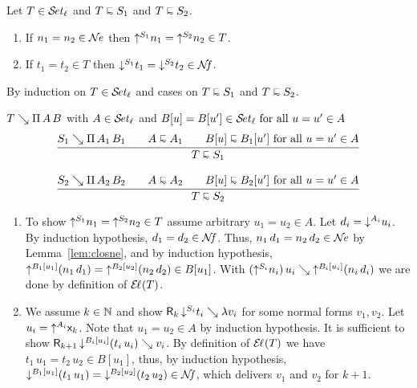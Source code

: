 \documentclass[acmlarge,review,anonymous]{acmart}\settopmatter{printfolios=true}
\makeatletter
\newenvironment{proof*}[1][\proofname]{\par
  \normalfont \topsep6\p@\@plus6\p@\relax
  \trivlist
  \item[\@proofindent\hskip\labelsep
        {\@proofnamefont #1\@addpunct{.}}]\ignorespaces
}{%
  \endtrivlist\@endpefalse
}
\makeatother
\begin{document}
\begin{theorem}
\label{thm:rere}
Let $T \in \SET[\ell]$ and $T \shape S_1$ and $T \shape S_2$.
\begin{enumerate}
\item If\/ $n_1 = n_2 \in \NE$ then $\up{S_1}{n_1} = \up{S_2}{n_2} \in T$.
\item If\/ $t_1 = t_2 \in T$ then $\down{S_1}{t_1} = \down{S_2}{t_2} \in \NF$.
\end{enumerate}
\end{theorem}
\begin{proof*}
By induction on $T \in \SET[\ell]$ and cases on $T \shape S_1$ and $T \shape S_2$.
\begin{caselist}

\nextcase $T \evalsto \piT A B$ with $A \in \SET[\ell]$ and
      $B[u] = B[u'] \in \SET[\ell] \mforall u = u' \in A$
\begin{gather*}
  \ru{S_1 \evalsto \piT{A_1}{B_1} \qquad
      A \shape A_1 \qquad
      B[u] \shape B_1[u'] \mforall u = u' \in A
    }{T \shape S_1}
\\[2ex]
  \ru{S_2 \evalsto \piT{A_2}{B_2} \qquad
      A \shape A_2 \qquad
      B[u] \shape B_2[u'] \mforall u = u' \in A
    }{T \shape S_2}
\end{gather*}
\begin{enumerate}
\item To show $\up{S_1}{n_1} = \up{S_2}{n_2} \in T$ assume arbitrary $u_1 = u_2 \in A$.
  Let $d_i = \down{A_i}{u_i}$.
  By induction hypothesis, $d_1 = d_2 \in \NF$.
  Thus, $n_1\,d_1 = n_2\,d_2 \in \NE$ by Lemma~\ref{lem:closne}, and
  by induction hypothesis,  $\up{B_1[u_1]}(n_1\,d_1) = \up{B_2[u_2]}(n_2\,d_2) \in B[u_1]$.
  With $(\up{S_i}{n_i})\,u_i \evalsto \up{B_i[u_i]}(n_i\,d_i)$ we are done by definition of $\EL(T)$.

\item We assume $k \in \NN$ and show $\R k {\down{S_i}{t_i}} \lambda v_i$ for some normal forms
$v_1,v_2$.  Let $u_i = \up{A_i} \lev k$.  Note that $u_1 = u_2 \in A$ by induction hypothesis.
It is sufficient to show
$\R{k+1}{\down{B_i[u_i]}{(t_i\,u_i)}} {v_i}$.
By definition of $\EL(T)$ we have $t_1\,u_1 = t_2\,u_2 \in B[u_1]$, thus, by induction hypothesis,
$\down{B_1[u_1]}(t_1\,u_1) = \down{B_2[u_2]}(t_2\,u_2) \in \NF$, which delivers $v_1$ and $v_2$ for $k+1$.
\end{enumerate}


\end{caselist}
\end{proof*}
\end{document}
